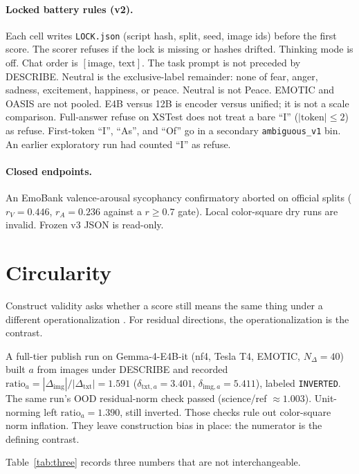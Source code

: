 \documentclass{article}
\begin{document}
\paragraph{Locked battery rules (v2).}
Each cell writes \texttt{LOCK.json} (script hash, split, seed, image ids) before the first score. The scorer refuses if the lock is missing or hashes drifted. Thinking mode is off. Chat order is $[\mathrm{image},\,\mathrm{text}]$. The task prompt is not preceded by DESCRIBE. Neutral is the exclusive-label remainder: none of fear, anger, sadness, excitement, happiness, or peace. Neutral is not Peace. EMOTIC and OASIS are not pooled. E4B versus 12B is encoder versus unified; it is not a scale comparison. Full-answer refuse on XSTest does not treat a bare ``I'' ($|\mathrm{token}|\le 2$) as refuse. First-token ``I'', ``As'', and ``Of'' go in a secondary \texttt{ambiguous\_v1} bin. An earlier exploratory run had counted ``I'' as refuse.

\paragraph{Closed endpoints.}
An EmoBank valence-arousal sycophancy confirmatory aborted on official splits ($r_V=0.446$, $r_A=0.236$ against a $r\ge 0.7$ gate). Local color-square dry runs are invalid. Frozen v3 JSON is read-only.

\section{Circularity}
\label{sec:circular}

Construct validity asks whether a score still means the same thing under a different operationalization \citep{messick1995validity}. For residual directions, the operationalization is the contrast.

A full-tier publish run on Gemma-4-E4B-it (nf4, Tesla T4, EMOTIC, $N_\Delta=40$) built $a$ from images under DESCRIBE and recorded $\mathrm{ratio}_a=|\Delta_{\mathrm{img}}|/|\Delta_{\mathrm{txt}}|=1.591$ ($\delta_{\mathrm{txt},a}=3.401$, $\delta_{\mathrm{img},a}=5.411$), labeled \texttt{INVERTED}. The same run's OOD residual-norm check passed (science/ref $\approx 1.003$). Unit-norming left $\mathrm{ratio}_a=1.390$, still inverted. Those checks rule out color-square norm inflation. They leave construction bias in place: the numerator is the defining contrast.

Table~\ref{tab:three} records three numbers that are not interchangeable.
\end{document}
